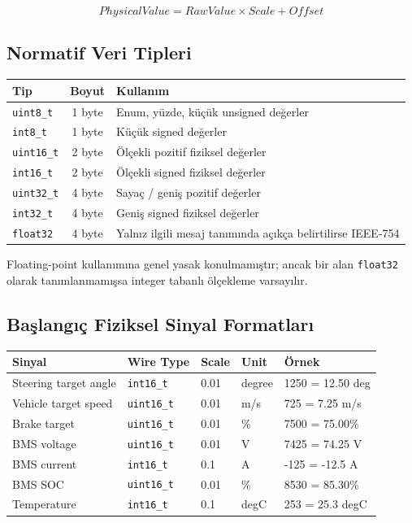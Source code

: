 \documentclass[a4paper,10pt]{article}
\newcommand{\code}[1]{\texttt{#1}}
\begin{document}
\[
PhysicalValue = RawValue \times Scale + Offset
\]

\subsection{Normatif Veri Tipleri}

\begin{center}
\begin{tabularx}{\textwidth}{l c X}
\toprule
Tip & Boyut & Kullanım \\
\midrule
\code{uint8\_t}  & 1 byte & Enum, yüzde, küçük unsigned değerler \\
\code{int8\_t}   & 1 byte & Küçük signed değerler \\
\code{uint16\_t} & 2 byte & Ölçekli pozitif fiziksel değerler \\
\code{int16\_t}  & 2 byte & Ölçekli signed fiziksel değerler \\
\code{uint32\_t} & 4 byte & Sayaç / geniş pozitif değerler \\
\code{int32\_t}  & 4 byte & Geniş signed fiziksel değerler \\
\code{float32}   & 4 byte & Yalnız ilgili mesaj tanımında açıkça belirtilirse IEEE-754 \\
\bottomrule
\end{tabularx}
\end{center}

Floating-point kullanımına genel yasak konulmamıştır; ancak bir alan \code{float32}
olarak tanımlanmamışsa integer tabanlı ölçekleme varsayılır.

\subsection{Başlangıç Fiziksel Sinyal Formatları}

\begin{center}
\begin{tabularx}{\textwidth}{l l l l X}
\toprule
Sinyal & Wire Type & Scale & Unit & Örnek \\
\midrule
Steering target angle & \code{int16\_t} & 0.01 & degree & 1250 = 12.50 deg \\
Vehicle target speed & \code{uint16\_t} & 0.01 & m/s & 725 = 7.25 m/s \\
Brake target & \code{uint16\_t} & 0.01 & \% & 7500 = 75.00\% \\
BMS voltage & \code{uint16\_t} & 0.01 & V & 7425 = 74.25 V \\
BMS current & \code{int16\_t} & 0.1 & A & -125 = -12.5 A \\
BMS SOC & \code{uint16\_t} & 0.01 & \% & 8530 = 85.30\% \\
Temperature & \code{int16\_t} & 0.1 & degC & 253 = 25.3 degC \\
\bottomrule
\end{tabularx}
\end{center}
\end{document}
